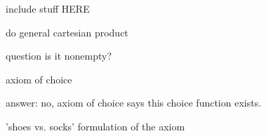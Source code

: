     \begin{center}
    \end{center}

    include stuff HERE 

    \begin{definition}
        
    \end{definition}


    do general cartesian product
    
    question is it nonempty?

    axiom of choice

    answer: no, axiom of choice says this choice function exists.

    'shoes vs. socks' formulation of the axiom

    \begin{center}
    \end{center}

